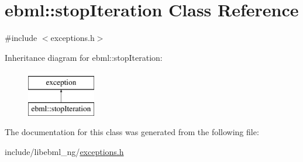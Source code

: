 \hypertarget{classebml_1_1stopIteration}{}\section{ebml\+:\+:stop\+Iteration Class Reference}
\label{classebml_1_1stopIteration}


{\ttfamily \#include $<$exceptions.\+h$>$}

Inheritance diagram for ebml\+:\+:stop\+Iteration\+:\begin{figure}[H]
\begin{center}
\leavevmode
\includegraphics[height=2.000000cm]{classebml_1_1stopIteration}
\end{center}
\end{figure}


The documentation for this class was generated from the following file\+:\begin{DoxyCompactItemize}
\item 
include/libebml\+\_\+ng/\mbox{\hyperlink{exceptions_8h}{exceptions.\+h}}\end{DoxyCompactItemize}
